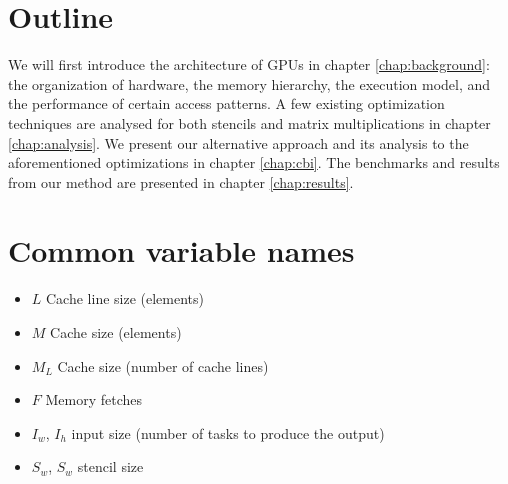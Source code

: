 \section{Outline}
We will first introduce the architecture of GPUs in chapter \ref{chap:background}: the organization of hardware, the memory hierarchy, the execution model, and the performance of certain access patterns.
A few existing optimization techniques are analysed for both stencils and matrix multiplications in chapter \ref{chap:analysis}.
We present our alternative approach and its analysis to the aforementioned optimizations in chapter \ref{chap:cbi}.
The benchmarks and results from our method are presented in chapter \ref{chap:results}.

\section{Common variable names}
\begin{itemize}
    \item $L$ Cache line size (elements)
    \item $M$ Cache size (elements)
    \item $M_L$ Cache size (number of cache lines)
    \item $F$ Memory fetches
    \item $I_w$, $I_h$ input size (number of tasks to produce the output)
    \item $S_w$, $S_w$ stencil size
\end{itemize}